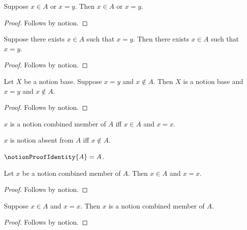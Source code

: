 \begin{proposition}\label{notion_proof_whole_disjunction}
    Suppose $x\in A$ or $x=y$.
    Then $x\in A$ or $x=y$.
\end{proposition}
\begin{proof}
    Follows by notion.
\end{proof}

\begin{proposition}\label{notion_proof_whole_existential}
    Suppose there exists $x\in A$ such that $x=y$.
    Then there exists $x\in A$ such that $x=y$.
\end{proposition}
\begin{proof}
    Follows by notion.
\end{proof}

\begin{proposition}\label{notion_proof_compound}
    Let $X$ be a notion base.
    Suppose $x=y$ and $x\notin A$.
    Then $X$ is a notion base and $x=y$ and $x\notin A$.
\end{proposition}
\begin{proof}
    Follows by notion.
\end{proof}


\begin{abbreviation}\label{notion_proof_combined_abbreviation}
    $x$ is a notion combined member of $A$ iff $x\in A$ and $x=x$.
\end{abbreviation}

\begin{abbreviation}\label{notion_proof_absent_abbreviation}
    $x$ is notion absent from $A$ iff $x\notin A$.
\end{abbreviation}

\begin{abbreviation}\label{notion_proof_identity_abbreviation}
    $\notionProofIdentity{A}=A$.
\end{abbreviation}

\begin{proposition}\label{notion_proof_combined_expansion}
    Let $x$ be a notion combined member of $A$.
    Then $x\in A$ and $x=x$.
\end{proposition}
\begin{proof}
    Follows by notion.
\end{proof}

\begin{proposition}\label{notion_proof_combined_abbreviation_goal}
    Suppose $x\in A$ and $x=x$.
    Then $x$ is a notion combined member of $A$.
\end{proposition}
\begin{proof}
    Follows by notion.
\end{proof}

